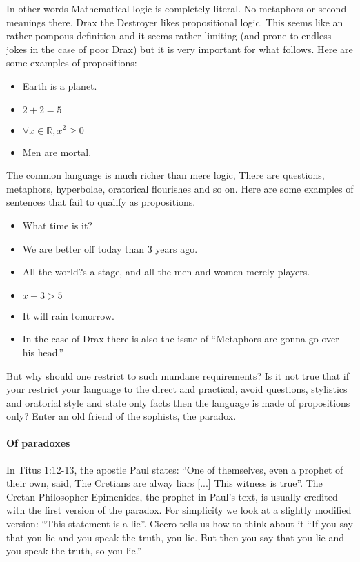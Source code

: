  In other words Mathematical logic is completely literal. No metaphors or second meanings there. Drax the Destroyer likes propositional logic. 
This seems like an rather pompous definition and it seems rather limiting (and prone to endless jokes in the case of poor Drax) but it is very important for what follows. Here are some examples of propositions:
\begin{itemize}
\item Earth is a planet.
\item $2+2=5$
\item $\forall x \in \mathbb{R}, x^2 \ge 0$
\item Men are mortal.
\end{itemize}
The common language is much richer than mere logic, There are questions, metaphors, hyperbolae, oratorical flourishes and so on. Here are some  examples of sentences that fail to qualify as propositions. 

\begin{itemize}

\item What time is it?
\item  We are better off today than 3 years ago.
\item  All the world?s a stage, and all the men and women merely players.
\item $x+3>5$
\item It will rain tomorrow.
\item In the case of Drax there is also the issue of ``Metaphors are gonna go over his head.''
\end{itemize}

But why should one restrict to such mundane requirements? Is it not true that if your restrict your language to the direct and practical, avoid questions, stylistics and oratorial style and state only facts then the language is made of propositions only? Enter an old friend of the sophists, the paradox.
\paragraph{\bf Of paradoxes }
In Titus 1:12-13, the apostle Paul states:
``One of themselves, even a prophet of their own, said, The Cretians are alway liars [...] This witness is true''.  The Cretan Philosopher  Epimenides, the prophet in Paul's text, is usually credited with the first version of the paradox.   For simplicity we look at a slightly modified version:  ``This statement is a lie''. Cicero \cite{Cic} tells us how to think about it ``If you say that you lie and you speak the truth, you lie. But then you say that you lie and you speak the truth, so you lie.''


